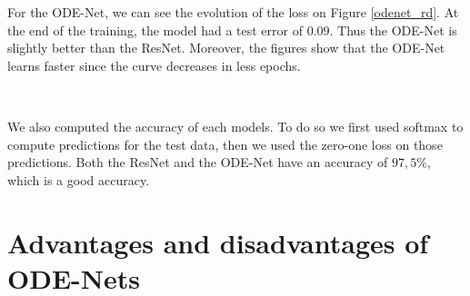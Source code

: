 \documentclass[10pt,a4paper]{article}
\theoremstyle{definition}
\theoremstyle{definition}
\theoremstyle{definition}
\begin{document}
For the ODE-Net, we can see the evolution of the loss on Figure \ref{odenet_rd}. At the end of the training, the model had a test error of $0.09$. Thus the ODE-Net is slightly better than the ResNet. Moreover, the figures show that the ODE-Net learns faster since the curve decreases in less epochs.

~

We also computed the accuracy of each models. To do so we first used softmax to compute predictions for the test data, then we used the zero-one loss on those predictions. Both the ResNet and the ODE-Net have an accuracy of $97,5\%$, which is a good accuracy.


\section{Advantages and disadvantages of ODE-Nets}
\end{document}
